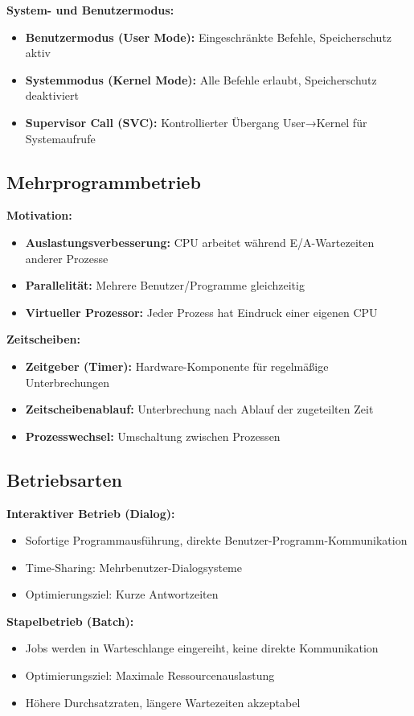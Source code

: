 \documentclass[9pt,a4paper]{extarticle}
\begin{document}
\begin{multicols*}{2}
\textbf{System- und Benutzermodus:}
\begin{itemize}
\item \textbf{Benutzermodus (User Mode):} Eingeschränkte Befehle, Speicherschutz aktiv
\item \textbf{Systemmodus (Kernel Mode):} Alle Befehle erlaubt, Speicherschutz deaktiviert
\item \textbf{Supervisor Call (SVC):} Kontrollierter Übergang User→Kernel für Systemaufrufe
\end{itemize}

\subsection{Mehrprogrammbetrieb}
\textbf{Motivation:}
\begin{itemize}
\item \textbf{Auslastungsverbesserung:} CPU arbeitet während E/A-Wartezeiten anderer Prozesse
\item \textbf{Parallelität:} Mehrere Benutzer/Programme gleichzeitig
\item \textbf{Virtueller Prozessor:} Jeder Prozess hat Eindruck einer eigenen CPU
\end{itemize}

\textbf{Zeitscheiben:}
\begin{itemize}
\item \textbf{Zeitgeber (Timer):} Hardware-Komponente für regelmäßige Unterbrechungen
\item \textbf{Zeitscheibenablauf:} Unterbrechung nach Ablauf der zugeteilten Zeit
\item \textbf{Prozesswechsel:} Umschaltung zwischen Prozessen
\end{itemize}

\subsection{Betriebsarten}
\textbf{Interaktiver Betrieb (Dialog):}
\begin{itemize}
\item Sofortige Programmausführung, direkte Benutzer-Programm-Kommunikation
\item Time-Sharing: Mehrbenutzer-Dialogsysteme
\item Optimierungsziel: Kurze Antwortzeiten
\end{itemize}

\textbf{Stapelbetrieb (Batch):}
\begin{itemize}
\item Jobs werden in Warteschlange eingereiht, keine direkte Kommunikation
\item Optimierungsziel: Maximale Ressourcenauslastung
\item Höhere Durchsatzraten, längere Wartezeiten akzeptabel
\end{itemize}


\end{multicols*}
\end{document}
